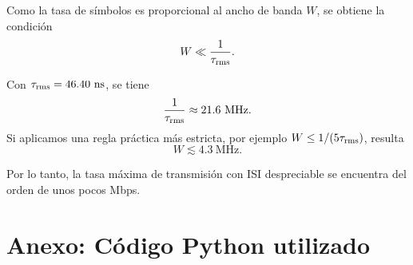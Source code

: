 \documentclass[11pt]{article}
\begin{document}
Como la tasa de símbolos es proporcional al ancho de banda $W$, se obtiene la condición
\[
W \ll \frac{1}{\tau_{\rm rms}}.
\]

Con $\tau_{\rm rms} = 46.40\ \text{ns}$, se tiene
\[
\frac{1}{\tau_{\rm rms}} \approx 21.6\ \text{MHz}.
\]
Si aplicamos una regla práctica más estricta, por ejemplo $W \leq 1/(5\tau_{\rm rms})$, resulta
\[
W \lesssim 4.3\ \text{MHz}.
\]

Por lo tanto, la tasa máxima de transmisión con ISI despreciable se encuentra del orden de unos pocos Mbps.


\section*{Anexo: Código Python utilizado}


\end{document}
